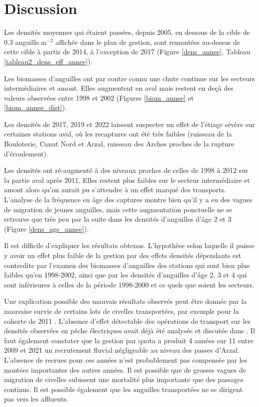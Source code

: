 \documentclass[10pt,twocolumn,titlepage,twoside]{article}\usepackage[]{graphicx}\usepackage[]{xcolor}
\begin{document}
%

\section[Discussion]{ Discussion}

Les densités moyennes qui étaient passées, depuis 2005, en dessous de la cible
de 0.3 anguille.m$^{-2}$ affichée dans le plan de gestion, sont remontées
au-dessus de cette cible à partir de 2014, à l'exception de 2017 
(Figure \ref{dens_annee}, Tableau \ref{tableau2_dens_eff_annee}). 

Les biomasses d'anguilles ont par contre connu une chute
continue sur les secteurs intermédiaires et amont. Elles augmentent en aval mais
restent en deçà des valeurs observées entre 1998 et 2002 (Figures
\ref{biom_annee} et \ref{biom_annee_dist}).

Les densités de 2017, 2019 et 2022 laissent suspecter un effet de l'étiage
sévère sur certaines stations aval, où les recaptures ont été très faibles 
(ruisseau de la Bouloterie, Canut Nord et Arzal, ruisseau des
Arches proches de la rupture d'écoulement).

Les densités ont
ré-augmenté à des niveaux proches de celles de 1998 à 2012 sur la partie aval
après 2011. Elles restent plus faibles sur le secteur intermédiaire et amont
alors qu'on aurait pu s'attendre à un effet marqué des transports.
L'analyse de la fréquence en âge des captures montre bien qu'il y a eu des vagues de migration 
de jeunes anguilles, mais cette augmentation ponctuelle ne se retrouve que très
peu par la suite dans les densités d'anguilles d'âge 2 et 3 (Figure
\ref{dens_age_annee}).

Il est difficile d'expliquer les résultats obtenus. 
L'hypothèse selon laquelle il puisse y avoir un effet plus faible de la gestion 
par des effets densités dépendants est contredite par l'examen des biomasses d'anguilles
des stations qui sont bien plus faibles qu'en 1998-2002, ainsi que par les densités 
d'anguilles d'âge 2, 3 et 4 qui sont inférieures à celles de la période 1998-2000 et 
ce quels que soient les secteurs. 

Une explication possible des mauvais résultats observés peut être donnée par la
mauvaise survie de certains lots de civelles transportées, par exemple pour la
cohorte de 2011 \citep{mazel_v._operation_2011}. L'absence d'effet détectable des opérations
de transport sur les densités
observées en pêche électriques avait déjà été analysée et discutée dans
\citet{briand_analyse_2011}. Il faut également constater que la gestion par
quota a produit 4 années sur 11 entre 2009 et 2021 un
recrutement fluvial négligeable au niveau des passes d'Arzal. L'absence de
recrues pour ces années n'est probablement pas compensée par les montées importantes des autres années. 
Il est possible que de grosses vagues de migration de civelles subissent
une mortalité plus importante que des passages continus. Il est possible
également que les anguilles transportées ne se dirigent pas vers les affluents.
\end{document}
